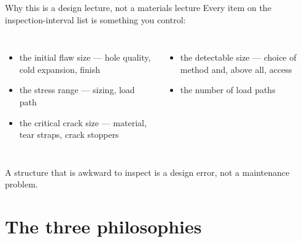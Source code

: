 \documentclass[aspectratio=169,10pt]{beamer}
\begin{document}
\begin{frame}{Why this is a design lecture, not a materials lecture}
Every item on the inspection-interval list is something \alert{you} control:
\begin{columns}[T]
\begin{itemize}\footnotesize
  \item the initial flaw size --- hole quality, cold expansion, finish
  \item the stress range --- sizing, load path
  \item the critical crack size --- material, tear straps, crack stoppers
\end{itemize}
\begin{itemize}\footnotesize
  \item the detectable size --- choice of method and, above all, \alert{access}
  \item the number of load paths
\end{itemize}
\end{columns}
\vspace{6pt}
\begin{alertblock}{}
A structure that is awkward to inspect is a \alert{design error}, not a maintenance problem.
\end{alertblock}
\end{frame}

\section{The three philosophies}
\end{document}
